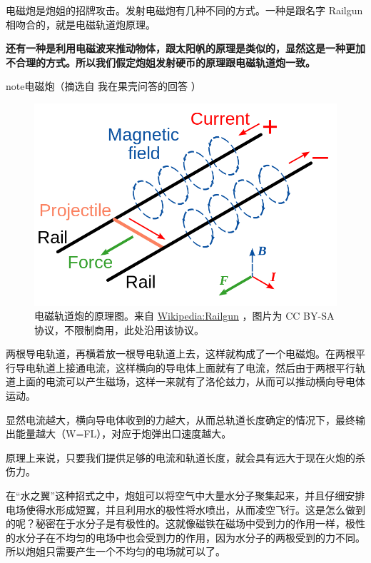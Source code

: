\documentclass[letterpaper,10pt,english]{sphinxmanual}
\begin{document}
电磁炮是炮姐的招牌攻击。发射电磁炮有几种不同的方式。一种是跟名字 Railgun 相吻合的，就是电磁轨道炮原理。

\textbf{还有一种是利用电磁波来推动物体，跟太阳帆的原理是类似的，显然这是一种更加不合理的方式。所以我们假定炮姐发射硬币的原理跟电磁轨道炮一致。}

\begin{notice}{note}{电磁炮（摘选自 我在果壳问答的回答 ）}
\begin{figure}[htbp]
\centering
\capstart

\includegraphics{railgun.png}
\caption{电磁轨道炮的原理图。来自 \href{https://en.wikipedia.org/wiki/File:Railgun-1.svg}{Wikipedia:Railgun} ，图片为 CC BY-SA 协议，不限制商用，此处沿用该协议。}\end{figure}

两根导电轨道，再横着放一根导电轨道上去，这样就构成了一个电磁炮。在两根平行导电轨道上接通电流，这样横向的导电体上面就有了电流，然后由于两根平行轨道上面的电流可以产生磁场，这样一来就有了洛伦兹力，从而可以推动横向导电体运动。

显然电流越大，横向导电体收到的力越大，从而总轨道长度确定的情况下，最终输出能量越大（W=FL），对应于炮弹出口速度越大。

原理上来说，只要我们提供足够的电流和轨道长度，就会具有远大于现在火炮的杀伤力。
\end{notice}

在“水之翼”这种招式之中，炮姐可以将空气中大量水分子聚集起来，并且仔细安排电场使得水形成短翼，并且利用水的极性将水喷出，从而凌空飞行。这是怎么做到的呢？秘密在于水分子是有极性的。这就像磁铁在磁场中受到力的作用一样，极性的水分子在不均匀的电场中也会受到力的作用，因为水分子的两极受到的力不同。所以炮姐只需要产生一个不均匀的电场就可以了。
\end{document}
